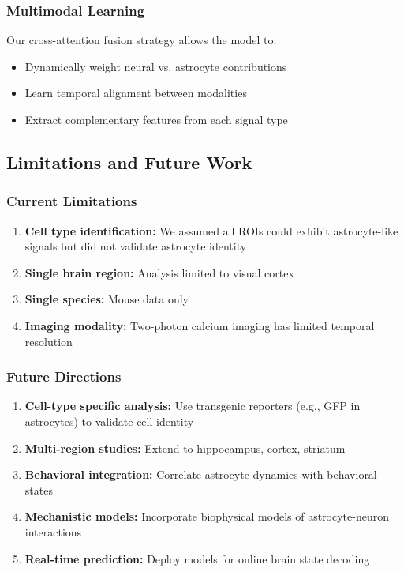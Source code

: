 \documentclass[11pt,twocolumn]{article}
\begin{document}
\subsubsection{Multimodal Learning}
Our cross-attention fusion strategy allows the model to:
\begin{itemize}
    \item Dynamically weight neural vs. astrocyte contributions
    \item Learn temporal alignment between modalities
    \item Extract complementary features from each signal type
\end{itemize}

\subsection{Limitations and Future Work}

\subsubsection{Current Limitations}
\begin{enumerate}
    \item \textbf{Cell type identification:} We assumed all ROIs could exhibit astrocyte-like signals but did not validate astrocyte identity
    \item \textbf{Single brain region:} Analysis limited to visual cortex
    \item \textbf{Single species:} Mouse data only
    \item \textbf{Imaging modality:} Two-photon calcium imaging has limited temporal resolution
\end{enumerate}

\subsubsection{Future Directions}
\begin{enumerate}
    \item \textbf{Cell-type specific analysis:} Use transgenic reporters (e.g., GFP in astrocytes) to validate cell identity
    \item \textbf{Multi-region studies:} Extend to hippocampus, cortex, striatum
    \item \textbf{Behavioral integration:} Correlate astrocyte dynamics with behavioral states
    \item \textbf{Mechanistic models:} Incorporate biophysical models of astrocyte-neuron interactions
    \item \textbf{Real-time prediction:} Deploy models for online brain state decoding
\end{enumerate}
\end{document}
